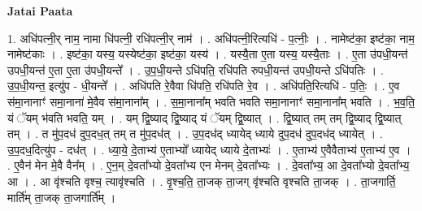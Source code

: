\documentclass[17pt]{extarticle}
\begin{document}
\textbf{Jatai Paata} \newline

1. अधि॑पत्नी॒र् नाम॒ नामा धि॑पत्नी॒ रधि॑पत्नी॒र् नाम॑ । . अधि॑पत्नी॒रित्यधि॑ - प॒त्नीः॒ । . नामेष्ट॑का॒ इष्ट॑का॒ नाम॒ नामेष्ट॑काः । . इष्ट॑का॒ यस्य॒ यस्येष्ट॑का॒ इष्ट॑का॒ यस्य॑ । . यस्यै॒ता ए॒ता यस्य॒ यस्यै॒ताः । . ए॒ता उ॑पधी॒यन्त॑ उपधी॒यन्त॑ ए॒ता ए॒ता उ॑पधी॒यन्ते᳚ । . उ॒प॒धी॒यन्ते ऽधि॑पति॒ रधि॑पति रुपधी॒यन्त॑ उपधी॒यन्ते ऽधि॑पतिः । . उ॒प॒धी॒यन्त॒ इत्यु॑प - धी॒यन्ते᳚ । . अधि॑पति रे॒वैवा धि॑पति॒ रधि॑पति रे॒व । . अधि॑पति॒रित्यधि॑ - प॒तिः॒ । . ए॒व स॑मा॒नानाꣳ॑ समा॒नाना॑ मे॒वैव स॑मा॒नाना᳚म् । . स॒मा॒नाना᳚म् भवति भवति समा॒नानाꣳ॑ समा॒नाना᳚म् भवति । . भ॒व॒ति॒ यं ॅयम् भ॑वति भवति॒ यम् । . यम् द्वि॒ष्याद् द्वि॒ष्याद् यं ॅयम् द्वि॒ष्यात् । . द्वि॒ष्यात् तम् तम् द्वि॒ष्याद् द्वि॒ष्यात् तम् । . त मु॑प॒दध॑ दुप॒दध॒त् तम् त मु॑प॒दध॑त् । . उ॒प॒दध॑द् ध्यायेद् ध्याये दुप॒दध॑ दुप॒दध॑द् ध्यायेत् । . उ॒प॒दध॒दित्यु॑प - दध॑त् । . ध्या॒ये॒ दे॒ताभ्य॑ ए॒ताभ्यो᳚ ध्यायेद् ध्याये दे॒ताभ्यः॑ । . ए॒ताभ्य॑ ए॒वैवैताभ्य॑ ए॒ताभ्य॑ ए॒व । . ए॒वैन॑ मेन मे॒वै वैन᳚म् । . ए॒न॒म् दे॒वता᳚भ्यो दे॒वता᳚भ्य एन मेनम् दे॒वता᳚भ्यः । . दे॒वता᳚भ्य॒ आ दे॒वता᳚भ्यो दे॒वता᳚भ्य॒ आ । . आ वृ॑श्चति वृश्च॒ त्यावृ॑श्चति । . वृ॒श्च॒ति॒ ता॒जक् ता॒जग् वृ॑श्चति वृश्चति ता॒जक् । . ता॒जगार्ति॒ मार्ति॑म् ता॒जक् ता॒जगार्ति᳚म् । \newline
\end{document}
